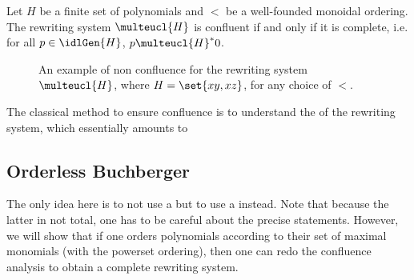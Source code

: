 \begin{lemma}
    Let $H$ be a finite set of polynomials
    and $<$ be a well-founded monoidal ordering.
    The rewriting system $\multeucl{H}$ is confluent
    if and only if it is complete, i.e. for all
    $p \in \idlGen{H}$, $p \multeucl{H}^* 0$.
\end{lemma}

\begin{figure}
    \centering
    \caption{
        An example of non confluence
        for the rewriting system
        $\multeucl{H}$, where $H = \set{ xy, xz }$,
        for any choice of 
        $<$.
    }
    \label{fig:buchberger-non-confluent}
\end{figure}

The classical method to ensure confluence is to 
understand the  of the rewriting
system, which essentially amounts to

\subsection{Orderless Buchberger}

The only idea here is to not use a  but
to use a  instead. Note that because
the latter in not total, one has to be careful about 
the precise statements. However, we will show that if one
orders polynomials according to their set of maximal monomials
(with the powerset ordering), then one can redo the confluence analysis
to obtain a complete rewriting system.


